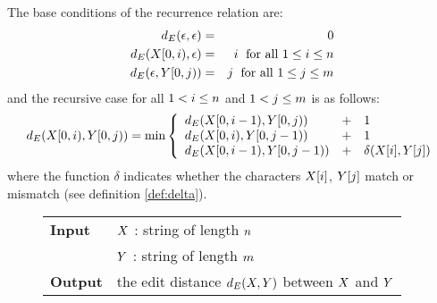 The base conditions of the recurrence relation are:
\begin{eqnarray}
d_E(\epsilon,\epsilon)&=&0\label{eq:dp-ee}\\
d_E(X[0,i),\epsilon)&=&i \; \text{ for all } 1 \leq i \leq n\label{eq:dp-row}\\
d_E(\epsilon, Y[0,j))&=&j \; \text{ for all } 1 \leq j \leq m\label{eq:dp-col}
\end{eqnarray}
and the recursive case for all $1 < i \leq n$ and $1 < j \leq m$ is as follows:
\begin{eqnarray}
d_E(X[0,i),Y[0,j)) = \text{min} \left\{
\begin{array}{lcl}
d_E(X[0,i-1),Y[0,j))&+&1\\
d_E(X[0,i),Y[0,j-1))&+&1\\
d_E(X[0,i-1),Y[0,j-1))&+&\delta(X[i], Y[j])
\end{array}
\right.\label{eq:dp-min}
\end{eqnarray}
where the function $\delta$ indicates whether the characters $X[i]$, $Y[j]$ match or mismatch (see definition \ref{def:delta}).

\begin{figure*}[t]
\begin{center}
\begin{minipage}[t]{.9\textwidth}
\begin{algorithm}[H]
\begin{tabular}{ll}
\textbf{Input}  & $X$ : string of length $n$\\
				& $Y$ : string of length $m$\\
\textbf{Output} & the edit distance $d_E(X,Y)$ between $X$ and $Y$\\
\end{tabular}
\begin{algorithmic}[1]
\EndFor
{}
	\EndFor
\EndFor
\State \Return {}
\end{algorithmic}
\label{alg:dp-edit}
\end{algorithm}
\end{minipage}
\end{center}
\end{figure*}

